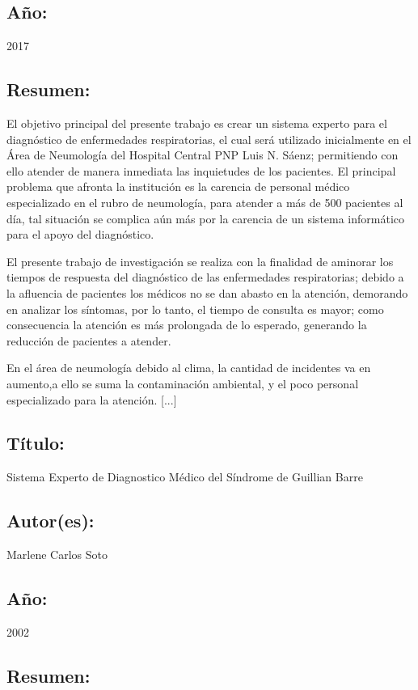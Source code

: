 \documentclass[preprint,12pt]{elsarticle}
\begin{document}
\subsection{Año:} 2017

\subsection{Resumen:}

El objetivo principal del presente trabajo es crear un sistema experto para el diagnóstico de enfermedades respiratorias, el cual será utilizado inicialmente en el Área de Neumología del Hospital Central PNP Luis N. Sáenz; permitiendo con ello atender de manera inmediata las inquietudes de los pacientes. El principal problema que afronta la institución es la carencia de personal médico especializado en el rubro de neumología, para atender a más de 500 pacientes al día, tal situación se complica aún más por la carencia de un sistema informático para el apoyo del diagnóstico.

El presente trabajo de investigación se realiza con la finalidad de aminorar los tiempos de respuesta del diagnóstico de las enfermedades respiratorias; debido a la afluencia de pacientes los médicos no se dan abasto en la atención, demorando en analizar los síntomas, por lo tanto, el tiempo de consulta es mayor; como consecuencia la atención es más prolongada de lo esperado, generando la reducción de pacientes a atender.

En el área de neumología debido al clima, la cantidad de incidentes va en aumento,a ello se suma la contaminación ambiental, y el poco personal especializado para la atención. [...]

\subsection{Título:} Sistema Experto de Diagnostico Médico del Síndrome de Guillian Barre

\subsection{Autor(es):} Marlene Carlos Soto

\subsection{Año:} 2002

\subsection{Resumen:}
\end{document}
